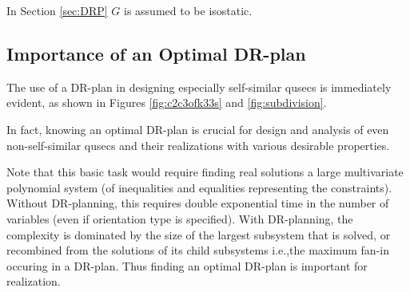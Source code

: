 





\noindent
\note In Section \ref{sec:DRP} $G$ is assumed to be isostatic.


\subsection{Importance of an Optimal DR-plan}
The use of a DR-plan in designing especially self-similar qusecs is
immediately evident, as shown in Figures \ref{fig:c2c3ofk33s} and
\ref{fig:subdivision}.

In fact, knowing an optimal DR-plan is crucial for
design and analysis of even non-self-similar qusecs and their
realizations with various desirable properties.

Note that this basic task
would require finding real solutions a large multivariate polynomial
system (of inequalities and equalities representing the constraints).
Without DR-planning, this requires double exponential time in the
number of variables (even if orientation type is specified). With
DR-planning, the complexity is dominated by the size of the largest
subsystem that is solved, or recombined from the solutions of its
child subsystems i.e.,the maximum fan-in occuring in a DR-plan. Thus
finding an optimal DR-plan is important for realization.

